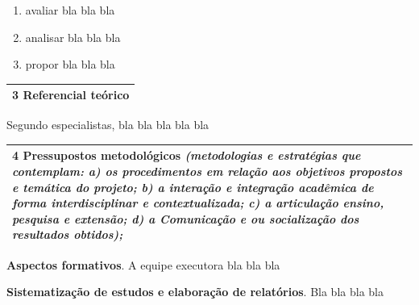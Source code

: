 \documentclass[
  11pt,				
  openright,	
  twoside,	
  a4paper,
  brazil,	
  oldfontcommands,
  ]{abntex2}
\newcommand{\subscript}[2]{$#1 _ #2$}
\begin{document}
\begin{enumerate}[label=(\subscript{e}{{\arabic*}})]

\item avaliar bla bla bla

\item analisar bla bla bla 

\item propor bla bla bla

\end{enumerate}


\begin{table}[H]
\begin{center}
\begin{tabularx}{\textwidth}{|X|}
\hline
{\bf 3 Referencial teórico}\\\hline
\end{tabularx}
\end{center}
\end{table}
\vspace{-10mm}

Segundo especialistas, bla bla bla bla bla


\begin{table}[H]
\begin{center}
\begin{tabularx}{\textwidth}{|X|}
\hline
{\bf 4 Pressupostos metodológicos} \textit{(metodologias e estratégias que contemplam: a) os procedimentos em relação aos objetivos propostos e temática do projeto; b) a interação e integração acadêmica de forma interdisciplinar e contextualizada; c) a articulação ensino, pesquisa e extensão; d) a Comunicação e ou socialização dos resultados obtidos);} \\\hline
\end{tabularx}
\end{center}
\end{table}
\vspace{-10mm}

\textbf{Aspectos formativos}.
A equipe executora bla bla bla

\textbf{Sistematização de estudos e elaboração de relatórios}.
Bla bla bla bla 
\end{document}
